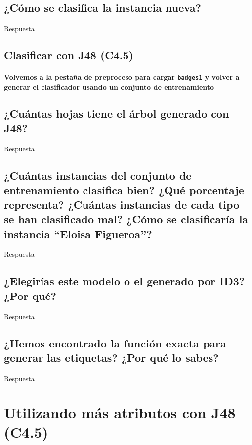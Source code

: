 \documentclass[12pt]{article}
\begin{document}
\subsection*{\small ¿Cómo se clasifica la instancia nueva?}

Respuesta

\newpage

\begin{center}
\section{Clasificar con J48 (C4.5)}
\end{center}

\paragraph{\small Volvemos a la pestaña de preproceso para cargar
\texttt{badges1} y volver a generar el clasificador usando un conjunto de
entrenamiento}

\subsection*{\small ¿Cuántas hojas tiene el árbol generado con J48?}

Respuesta

\subsection*{\small ¿Cuántas instancias del conjunto de entrenamiento clasifica
bien? ¿Qué porcentaje representa? ¿Cuántas instancias de cada tipo se han
clasificado mal? ¿Cómo se clasificaría la instancia ``Eloisa Figueroa''?}

Respuesta

\subsection*{\small ¿Elegirías este modelo o el generado por ID3? ¿Por qué?}

Respuesta

\subsection*{\small ¿Hemos encontrado la función exacta para generar las
etiquetas? ¿Por qué lo sabes?}

Respuesta

\newpage

\section{Utilizando más atributos con J48 (C4.5)}
\end{document}

